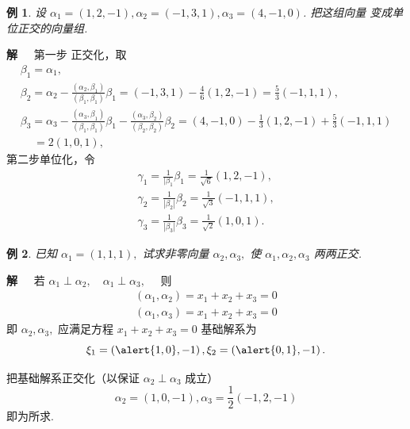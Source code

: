 \documentclass[13pt]{beamer}
\newtheorem{exa}{例}
\def\sol{{\bf 解~~ }}
\def\a{\alpha}
\def\b{\beta}
\def\r{\gamma}
\begin{document}
\begin{frame}
\begin{exa}
设 ${\a}_{1}=\left({1}, {2},  {-1}\right), {\a}_{2}=\left( {- 1},  {3}, {1}\right), {\a}_{3}=\left({4}, {- 1},  {0}\right)$.
 把这组向量 变成单位正交的向量组. 
\end{exa}
\pause
\sol 第一步 正交化，取
\[\begin{array}{l}
\b_{1}  =\a_{1}, \\
\b_{2}  =\a_{2}-\frac{\left(\a_{2}, \b_{1} \right)}{\left(\b_{1}, \b_{1}\right)} \b_{1}=\left( -1,  3, 1\right)-\frac{4}{6}\left(1, 2, -1\right)=\frac{5}{3}\left(-1, 1, 1\right), \\
{\b}_{3}  ={\a}_{3}-\frac{\left({{\a}_{3}, \b}_{1}\right)}{\left({\b}_{1}, {\b}_{1}\right)} {\b}_{1}-\frac{\left({\a}_{3}, {\b}_{2}\right)}{\left({\b}_{2}, {\b}_{2}\right)} {\b}_{2}=\left({4},  -{1}, {0}\right)-\frac{{1}}{{3}}\left({1}, {2}, {- 1}\right)+\frac{{5}}{{3}}\left({- 1}, {1}, {1}\right)\\
\, \quad ={2}\left({1}, {0}, {1}\right),
\end{array}\]
第二步单位化，令
\[\begin{array}{l}
\r_{1}=\frac{1}{| \b_{1} } \b_{1}=\frac{1}{\sqrt{6}}\left(1, 2, -1\right),\\
\r_{2}=\frac{1}{| \b_{2} |} \b_{2}=\frac{1}{\sqrt{3}}\left(-1, 1,  1\right),\\
\r_{3}=\frac{1}{| \b_{3} |} \b_{3}=\frac{1}{\sqrt{2}}\left(1, 0,  1\right).
\end{array}\]
\end{frame}


\begin{frame}
\begin{exa}
已知 $\a_{1}=\left( {1}, {1}, {1}\right),$ 试求非零向量 $\a_{2}, \a_{3},$ 使 $\a_{1}, \a_{2}, \a_{3}$ 两两正交.
\end{exa} 
\sol 若 $\a_{1} \perp \a_{2}, \quad \a_{1} \perp \a_{3}, \quad$ 则
\[
\begin{array}{l}
{\left(\a_{1}, \a_{2}\right)=x_{1}+x_{2}+x_{3}=0} \\
{\left(\a_{1}, \a_{3}\right)=x_{1}+x_{2}+x_{3}=0}
\end{array}
\]
即 $\a_{2}, \a_{3},$ 应满足方程 $x_{1}+x_{2}+x_{3}=0$
基础解系为 $$\xi_{1}=\left( \alert{1, 0}, -1 \right), \xi_{2}=\left(\alert{0, 1}, -1\right).$$

把基础解系正交化（以保证 $\a_{2} \perp \a_{3}$ 成立）
$$\a_{2}=\left( 1,  0,  -1\right), \a_{3}=\frac{1}{2}\left(-1, 2, -1\right)$$
 即为所求.
\end{frame}
\end{document}
